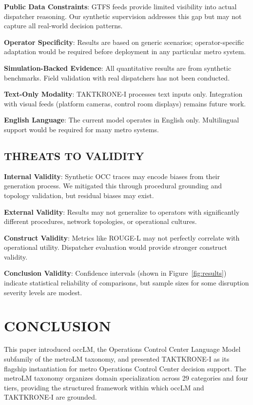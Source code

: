 \documentclass{IEEEoj}
\begin{document}
\textbf{Public Data Constraints}: GTFS feeds provide limited visibility into actual dispatcher reasoning. Our synthetic supervision addresses this gap but may not capture all real-world decision patterns.

\textbf{Operator Specificity}: Results are based on generic scenarios; operator-specific adaptation would be required before deployment in any particular metro system.

\textbf{Simulation-Backed Evidence}: All quantitative results are from synthetic benchmarks. Field validation with real dispatchers has not been conducted.

\textbf{Text-Only Modality}: TAKTKRONE-I processes text inputs only. Integration with visual feeds (platform cameras, control room displays) remains future work.

\textbf{English Language}: The current model operates in English only. Multilingual support would be required for many metro systems.

\subsection{THREATS TO VALIDITY}

\textbf{Internal Validity}: Synthetic OCC traces may encode biases from their generation process. We mitigated this through procedural grounding and topology validation, but residual biases may exist.

\textbf{External Validity}: Results may not generalize to operators with significantly different procedures, network topologies, or operational cultures.

\textbf{Construct Validity}: Metrics like ROUGE-L may not perfectly correlate with operational utility. Dispatcher evaluation would provide stronger construct validity.

\textbf{Conclusion Validity}: Confidence intervals (shown in Figure~\ref{fig:results}) indicate statistical reliability of comparisons, but sample sizes for some disruption severity levels are modest.

\section{CONCLUSION}
\label{sec:conclusion}

This paper introduced occLM, the Operations Control Center Language Model subfamily of the metroLM taxonomy, and presented TAKTKRONE-I as its flagship instantiation for metro Operations Control Center decision support. The metroLM taxonomy organizes domain specialization across 29 categories and four tiers, providing the structured framework within which occLM and TAKTKRONE-I are grounded.
\end{document}
